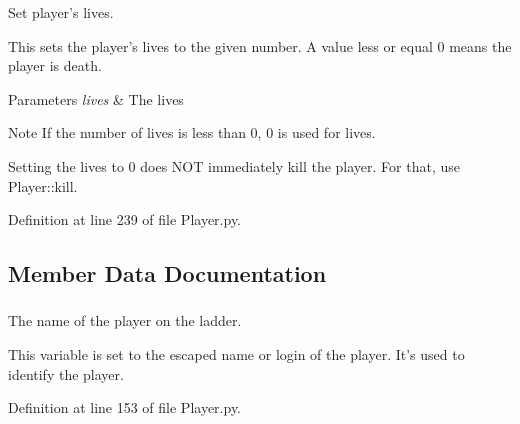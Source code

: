\-Set player's lives. 

\-This sets the player's lives to the given number. \-A value less or equal 0 means the player is death. 
\begin{DoxyParams}{\-Parameters}
{\em lives} & \-The lives \\
\hline
\end{DoxyParams}
\begin{DoxyNote}{\-Note}
\-If the number of lives is less than 0, 0 is used for lives. 

\-Setting the lives to 0 does \-N\-O\-T immediately kill the player. \-For that, use \-Player\-::kill. 
\end{DoxyNote}


\-Definition at line 239 of file \-Player.\-py.



\subsection{\-Member \-Data \-Documentation}
\hypertarget{class_player_1_1_player_a27e445a0784d93ee71dd26ae3141b4f1}{
\subsubsection[{\-\_\-\-\_\-ladder\-\_\-name}]{}}
\label{class_player_1_1_player_a27e445a0784d93ee71dd26ae3141b4f1}


\-The name of the player on the ladder. 

\-This variable is set to the escaped name or login of the player. \-It's used to identify the player. 

\-Definition at line 153 of file \-Player.\-py.

\hypertarget{class_player_1_1_player_a2fb60b55b201da99002ab522b4b411ca}{
\subsubsection[{\-\_\-\-\_\-lives}]{}}
\label{class_player_1_1_player_a2fb60b55b201da99002ab522b4b411ca}


